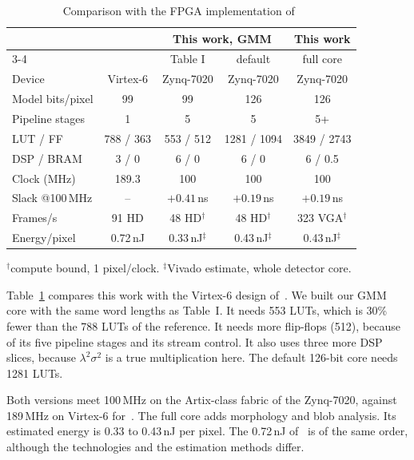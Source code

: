 \documentclass[conference]{IEEEtran}
\begin{document}
\begin{table}[!t]
\caption{Comparison with the FPGA implementation of~\cite{genovese2014}}
\label{tab:cmp}
\centering
\setlength{\tabcolsep}{3pt}
\begin{tabular}{@{}lcccc@{}}
\toprule
 & \cite{genovese2014} & \multicolumn{2}{c}{This work, GMM} & This work\\
\cmidrule(lr){3-4}
 &  & Table I & default & full core\\
\midrule
Device           & Virtex-6 & Zynq-7020 & Zynq-7020 & Zynq-7020\\
Model bits/pixel & 99 & 99 & 126 & 126\\
Pipeline stages  & 1 & 5 & 5 & 5+\\
LUT / FF         & 788 / 363 & 553 / 512 & 1281 / 1094 & 3849 / 2743\\
DSP / BRAM       & 3 / 0 & 6 / 0 & 6 / 0 & 6 / 0.5\\
Clock (MHz)      & 189.3 & 100 & 100 & 100\\
Slack @100\,MHz  & -- & $+0.41$\,ns & $+0.19$\,ns & $+0.19$\,ns\\
Frames/s         & 91 HD & 48 HD$^\dagger$ & 48 HD$^\dagger$ & 323 VGA$^\dagger$\\
Energy/pixel     & 0.72\,nJ & 0.33\,nJ$^\ddagger$ & 0.43\,nJ$^\ddagger$ & 0.43\,nJ$^\ddagger$\\
\bottomrule
\end{tabular}

\vspace{1pt}
{\footnotesize $^\dagger$compute bound, 1 pixel/clock.
$^\ddagger$Vivado estimate, whole detector core.}
\end{table}

Table~\ref{tab:cmp} compares this work with the Virtex-6 design
of~\cite{genovese2014}. We built our GMM core with the same word lengths as
Table~I. It needs 553 LUTs, which is 30\% fewer than the 788 LUTs of the
reference. It needs more flip-flops (512), because of its five pipeline stages
and its stream control. It also uses three more DSP slices, because
$\lambda^2\sigma^2$ is a true multiplication here. The default 126-bit core needs
1281 LUTs.

Both versions meet 100\,MHz on the Artix-class fabric of the Zynq-7020, against
189\,MHz on Virtex-6 for~\cite{genovese2014}. The full core adds morphology and
blob analysis. Its estimated energy is 0.33 to 0.43\,nJ per pixel. The 0.72\,nJ
of~\cite{genovese2014} is of the same order, although the technologies and the
estimation methods differ.
\end{document}
